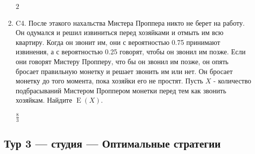 \documentclass[12pt]{article}
\DeclareMathOperator{\E}{E}
\newenvironment{problem}{}{}
\newenvironment{sol}{}{} %
\begin{document}
\begin{enumerate}
\begin{problem}
\begin{sol}
$2$
\end{sol}
\end{problem}

\begin{problem}
\item[C4.] 
После этакого нахальства Мистера Проппера никто не берет на работу. Он одумался и решил извиниться перед хозяйками и отмыть им всю квартиру. Когда он звонит им, они с вероятностью 0.75 принимают извинения, а с вероятностью 0.25 говорят, чтобы он звонил им позже. Если они говорят Мистеру Пропперу, что бы он звонил им позже, он опять бросает правильную монетку и решает звонить им или нет. Он бросает монетку до того момента, пока хозяйки его не простят. Пусть $X$ - количество подбрасываний Мистером Проппером монетки перед тем как звонить хозяйкам. Найдите $\E(X)$.

\begin{sol}
$\frac{8}{3}$
\end{sol}
\end{problem}
\end{enumerate}

\newpage
\subsection{Тур 3 — студия — Оптимальные стратегии}
\end{document}
